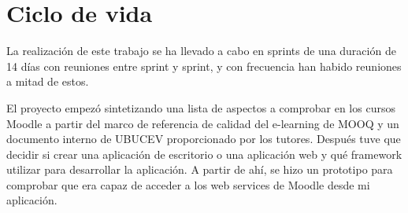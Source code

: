 \section{Ciclo de vida}
La realización de este trabajo se ha llevado a cabo en sprints de una duración de 14 días con reuniones entre sprint y sprint, y con frecuencia han habido reuniones a mitad de estos.

El proyecto empezó sintetizando una lista de aspectos a comprobar en los cursos Moodle a partir del marco de referencia de calidad del e-learning de MOOQ \cite{stracke2018quality} y un documento interno de UBUCEV proporcionado por los tutores.
Después tuve que decidir si crear una aplicación de escritorio o una aplicación web y qué framework utilizar para desarrollar la aplicación.
A partir de ahí, se hizo un prototipo para comprobar que era capaz de acceder a los web services de Moodle desde mi aplicación.


